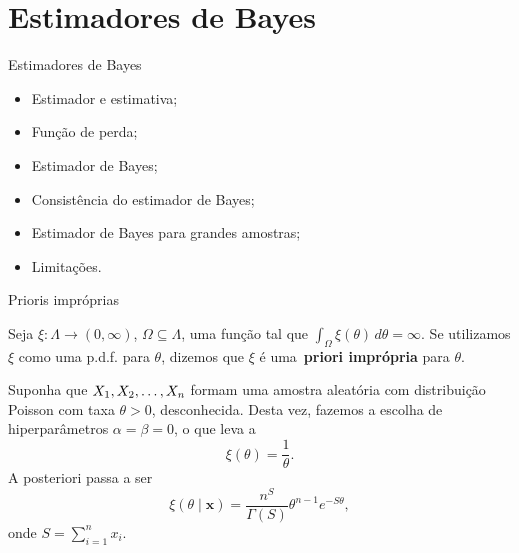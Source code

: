 \section*{Estimadores de Bayes}
\begin{frame}{Estimadores de Bayes}
 \begin{itemize}
  \item  Estimador e estimativa;
  \item Função de perda;
  \item Estimador de Bayes;
  \item Consistência do estimador de Bayes;
  \item Estimador de Bayes para grandes amostras;
  \item Limitações.
 \end{itemize}
\end{frame}


\begin{frame}{Prioris impróprias}
 \begin{defn}
 \label{def:improper_prior}
 Seja $\xi : \Lambda \to (0, \infty)$, $\Omega \subseteq \Lambda$, uma função tal que $\int_{\Omega} \xi(\theta)\,d\theta = \infty$.
 Se utilizamos $\xi$ como uma p.d.f. para $\theta$, dizemos que $\xi$ é uma~\textbf{priori imprópria} para $\theta$.
 \end{defn}
\begin{exemplo}
\label{ex:improper_Poisson_rate}
   Suponha que $X_1, X_2, \ldots, X_n$ formam uma amostra aleatória com distribuição Poisson com taxa $\theta > 0$, desconhecida.
   Desta vez, fazemos a escolha de hiperparâmetros $\alpha = \beta = 0$, o que leva a 
   \begin{equation*}
    \xi(\theta) = \frac{1}{\theta}.
   \end{equation*}
A posteriori passa a ser 
  \begin{equation*}
   \xi(\theta \mid \boldsymbol{x}) = \frac{ n^{S} }{\Gamma(S)} \theta^{n-1} e^{-S\theta},
  \end{equation*}
   onde $S = \sum_{i=1}^n x_i$.
\end{exemplo}
\end{frame}


